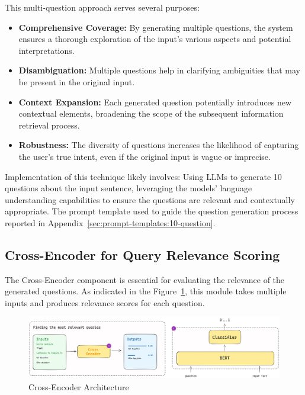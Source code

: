 This multi-question approach serves several purposes:
\begin{itemize}
    \item \textbf{Comprehensive Coverage:} By generating multiple questions, the system ensures a thorough exploration of the input's various aspects and potential interpretations.
    \item \textbf{Disambiguation:} Multiple questions help in clarifying ambiguities that may be present in the original input.
    \item \textbf{Context Expansion:} Each generated question potentially introduces new contextual elements, broadening the scope of the subsequent information retrieval process.
    \item \textbf{Robustness:} The diversity of questions increases the likelihood of capturing the user's true intent, even if the original input is vague or imprecise.
\end{itemize}

Implementation of this technique likely involves:
Using \ac{LLMs} to generate 10 questions about the input sentence, leveraging the models' language understanding capabilities to ensure the questions are relevant and contextually appropriate.
The prompt template used to guide the question generation process reported in Appendix~\ref{sec:prompt-templates:10-question}.

\subsection{Cross-Encoder for Query Relevance Scoring}\label{subsec:cross-encoder-for-query-relevance-scoring}
The Cross-Encoder component is essential for evaluating the relevance of the generated questions.
As indicated in the Figure~\ref{fig:cross-encoder-articture}, this module takes multiple inputs and produces relevance scores for each question.

\begin{figure}[ht!]
    \centering
    \begin{minipage}[b]{\textwidth}
        \centering
        \includegraphics[width=\textwidth]{res/Cross-Encoder}
        \caption{Cross-Encoder Architecture}
        \label{fig:cross-encoder-articture}
    \end{minipage}
\end{figure}

